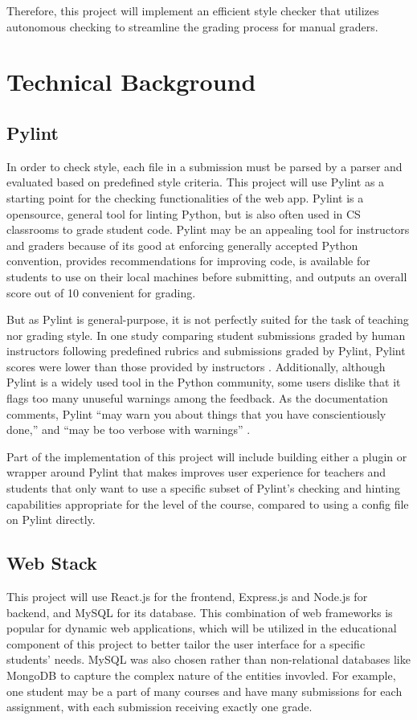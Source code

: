 \documentclass[10pt,twocolumn]{article}
\begin{document}
Therefore, this project will implement an efficient style checker that utilizes autonomous checking to streamline the grading process for manual graders.  


\section{Technical Background}
\subsection{Pylint}
In order to check style, each file in a submission must be parsed by a parser and evaluated based on predefined style criteria. 
This project will use Pylint as a starting point for the checking functionalities of the web app. 
Pylint is a opensource, general tool for linting Python, but is also often used in CS classrooms to grade student code. 
Pylint may be an appealing tool for instructors and graders because of its good at enforcing generally accepted Python convention, provides recommendations for improving code, is available for students to use on their local machines before submitting, and outputs an overall score out of 10 convenient for grading. 

But as Pylint is general-purpose, it is not perfectly suited for the task of teaching nor grading style. 
In one study comparing student submissions graded by human instructors following predefined rubrics and submissions graded by Pylint, Pylint scores were lower than those provided by instructors \cite{dasgupta_2017}. 
Additionally, although Pylint is a widely used tool in the Python community, some users dislike that it flags too many unuseful warnings among the feedback. 
As the documentation comments, Pylint “may warn you about things that you have conscientiously done,” and “may be too verbose with warnings” \cite{pylint_documentation_2022}.

Part of the implementation of this project will include building either a plugin or wrapper around Pylint that makes improves user experience for teachers and students that only want to use a specific subset of Pylint's checking and hinting capabilities appropriate for the level of the course, compared to using a config file on Pylint directly. 

\subsection{Web Stack}
This project will use React.js for the frontend, Express.js and Node.js for backend, and MySQL for its database. 
This combination of web frameworks is popular for dynamic web applications, which will be utilized in the educational component of this project to better tailor the user interface for a specific students' needs. 
MySQL was also chosen rather than non-relational databases like MongoDB to capture the complex nature of the entities invovled. 
For example, one student may be a part of many courses and have many submissions for each assignment, with each submission receiving exactly one grade.
\end{document}
